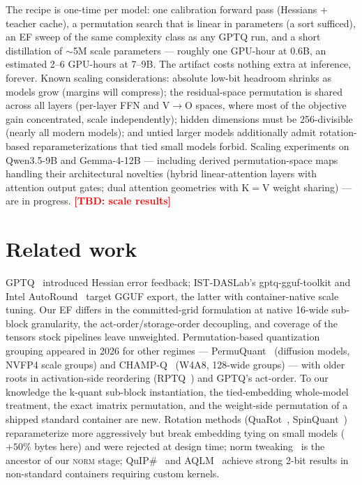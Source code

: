 \documentclass[11pt]{article}
\newcommand{\TBD}[1]{\textcolor{red}{\textbf{[TBD: #1]}}}
\begin{document}
The recipe is one-time per model: one calibration forward pass (Hessians + teacher
cache), a permutation search that is linear in parameters (a sort sufficed), an EF
sweep of the same complexity class as any GPTQ run, and a short distillation of
$\sim$5M scale parameters --- roughly one GPU-hour at 0.6B, an estimated 2--6 GPU-hours
at 7--9B. The artifact costs nothing extra at inference, forever. Known scaling
considerations: absolute low-bit headroom shrinks as models grow (margins will
compress); the residual-space permutation is shared across all layers (per-layer FFN
and V$\to$O spaces, where most of the objective gain concentrated, scale
independently); hidden dimensions must be 256-divisible (nearly all modern models);
and untied larger models additionally admit rotation-based reparameterizations that
tied small models forbid. Scaling experiments on Qwen3.5-9B and Gemma-4-12B ---
including derived permutation-space maps handling their architectural novelties
(hybrid linear-attention layers with attention output gates; dual attention
geometries with K$=$V weight sharing) --- are in progress. \TBD{scale results}

\section{Related work}

GPTQ~\cite{gptq} introduced Hessian error feedback; IST-DASLab's gptq-gguf-toolkit
and Intel AutoRound~\cite{autoround} target GGUF export, the latter with
container-native scale tuning. Our EF differs in the committed-grid formulation at
native 16-wide sub-block granularity, the act-order/storage-order decoupling, and
coverage of the tensors stock pipelines leave unweighted. Permutation-based
quantization grouping appeared in 2026 for other regimes --- PermuQuant~\cite{permuquant}
(diffusion models, NVFP4 scale groups) and CHAMP-Q~\cite{champq} (W4A8, 128-wide
groups) --- with older roots in activation-side reordering (RPTQ~\cite{rptq}) and
GPTQ's act-order. To our knowledge the k-quant sub-block instantiation, the
tied-embedding whole-model treatment, the exact imatrix permutation, and the
weight-side permutation of a shipped standard container are new. Rotation methods
(QuaRot~\cite{quarot}, SpinQuant~\cite{spinquant}) reparameterize more aggressively
but break embedding tying on small models ($+50\%$ bytes here) and were rejected at
design time; norm tweaking~\cite{normtweaking} is the ancestor of our \textsc{norm}
stage; QuIP\#~\cite{quipsharp} and AQLM~\cite{aqlm} achieve strong 2-bit results in
non-standard containers requiring custom kernels.
\end{document}
